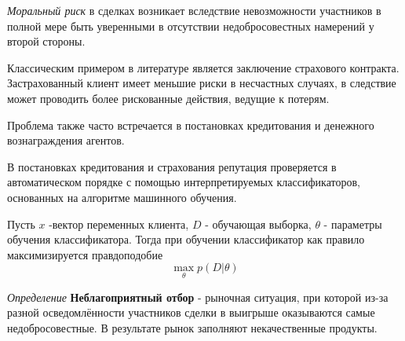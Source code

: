 \textit{Моральный  риск} в сделках возникает вследствие невозможности участников в полной мере быть уверенными в отсутствии недобросовестных намерений у второй стороны.

Классическим примером в литературе является заключение страхового контракта. Застрахованный клиент имеет меньшие риски в несчастных случаях, в следствие может проводить более рискованные действия, ведущие к потерям.

Проблема также часто встречается в постановках кредитования и денежного вознаграждения агентов.

В постановках кредитования и страхования репутация проверяется в автоматическом порядке с помощью интерпретируемых классификаторов, основанных на алгоритме машинного обучения.

Пусть $x$ -вектор переменных клиента, $D$ - обучающая выборка,  $\theta$ -  параметры обучения классификатора. Тогда при обучении классификатор как правило максимизируется правдоподобие
$$
    \max_\theta  p(D|\theta) 
$$


\textit{Определение} \textbf{Неблагоприятный отбор}  \cite{akerlof1978market} - рыночная ситуация, при которой из-за разной осведомлённости участников сделки в выигрыше оказываются самые недобросовестные. В результате рынок заполняют некачественные продукты.